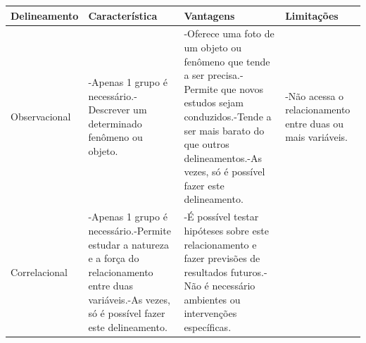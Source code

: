 \documentclass[
]{book}
\begin{document}
\begin{longtable}[]{@{}llll@{}}
\toprule
\begin{minipage}[b]{0.22\columnwidth}\raggedright
Delineamento\strut
\end{minipage} & \begin{minipage}[b]{0.22\columnwidth}\raggedright
Característica\strut
\end{minipage} & \begin{minipage}[b]{0.22\columnwidth}\raggedright
Vantagens\strut
\end{minipage} & \begin{minipage}[b]{0.22\columnwidth}\raggedright
Limitações\strut
\end{minipage}\tabularnewline
\midrule
\endhead
\begin{minipage}[t]{0.22\columnwidth}\raggedright
Observacional\strut
\end{minipage} & \begin{minipage}[t]{0.22\columnwidth}\raggedright
-Apenas 1 grupo é necessário.-Descrever um determinado fenômeno ou objeto.\strut
\end{minipage} & \begin{minipage}[t]{0.22\columnwidth}\raggedright
-Oferece uma foto de um objeto ou fenômeno que tende a ser precisa.-Permite que novos estudos sejam conduzidos.-Tende a ser mais barato do que outros delineamentos.-As vezes, só é possível fazer este delineamento.\strut
\end{minipage} & \begin{minipage}[t]{0.22\columnwidth}\raggedright
-Não acessa o relacionamento entre duas ou mais variáveis.\strut
\end{minipage}\tabularnewline
\begin{minipage}[t]{0.22\columnwidth}\raggedright
Correlacional\strut
\end{minipage} & \begin{minipage}[t]{0.22\columnwidth}\raggedright
-Apenas 1 grupo é necessário.-Permite estudar a natureza e a força do relacionamento entre duas variáveis.-As vezes, só é possível fazer este delineamento.\strut
\end{minipage} & \begin{minipage}[t]{0.22\columnwidth}\raggedright
-É possível testar hipóteses sobre este relacionamento e fazer previsões de resultados futuros.-Não é necessário ambientes ou intervenções específicas.\strut
\end{minipage} & \begin{minipage}[t]{0.22\columnwidth}\raggedright

\end{minipage}
\end{longtable}
\end{document}
